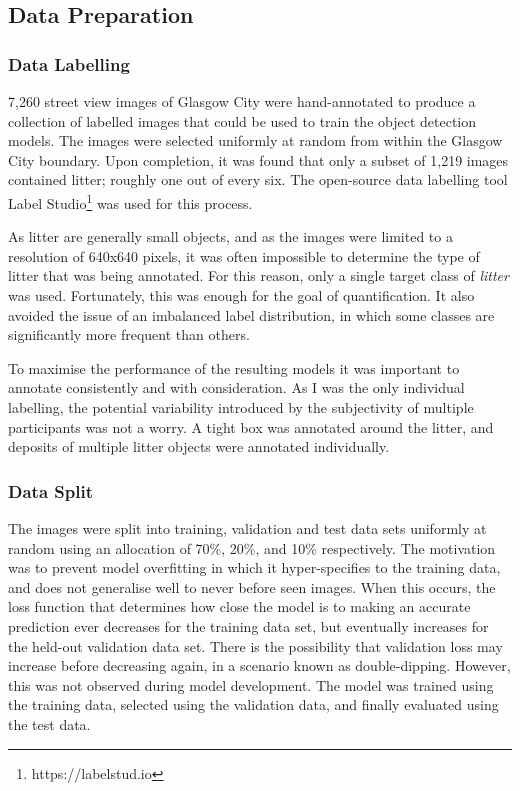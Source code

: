 \documentclass{thesis}
\begin{document}
\subsection{Data Preparation}

\subsubsection{Data Labelling}

7,260 street view images of Glasgow City were hand-annotated to produce a collection of labelled images that could be used to train the object detection models. The images were selected uniformly at random from within the Glasgow City boundary. Upon completion, it was found that only a subset of 1,219 images contained litter; roughly one out of every six. The open-source data labelling tool Label Studio\footnote{https://labelstud.io} was used for this process.

As litter are generally small objects, and as the images were limited to a resolution of 640x640 pixels, it was often impossible to determine the type of litter that was being annotated. For this reason, only a single target class of \textit{litter} was used. Fortunately, this was enough for the goal of quantification. It also avoided the issue of an imbalanced label distribution, in which some classes are significantly more frequent than others.

To maximise the performance of the resulting models it was important to annotate consistently and with consideration. As I was the only individual labelling, the potential variability introduced by the subjectivity of multiple participants was not a worry. A tight box was annotated around the litter, and deposits of multiple litter objects were annotated individually.

\subsubsection{Data Split}

The images were split into training, validation and test data sets uniformly at random using an allocation of 70\%, 20\%, and 10\% respectively. The motivation was to prevent model overfitting in which it hyper-specifies to the training data, and does not generalise well to never before seen images. When this occurs, the loss function that determines how close the model is to making an accurate prediction ever decreases for the training data set, but eventually increases for the held-out validation data set. There is the possibility that validation loss may increase before decreasing again, in a scenario known as double-dipping. However, this was not observed during model development. The model was trained using the training data, selected using the validation data, and finally evaluated using the test data.
\end{document}
